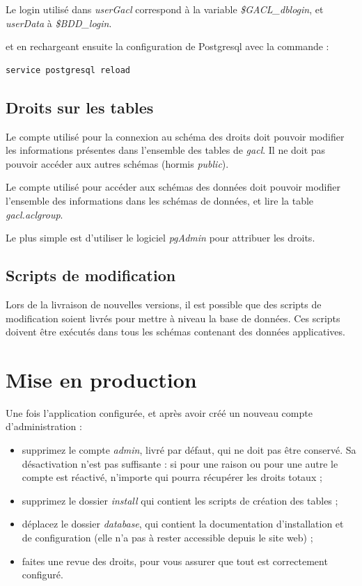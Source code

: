 Le login utilisé dans \textit{userGacl} correspond à la variable \textit{\$GACL\_dblogin}, et \textit{userData} à \textit{\$BDD\_login}.

et en rechargeant ensuite la configuration de Postgresql avec la commande :
\begin{lstlisting}
service postgresql reload
\end{lstlisting}

\subsection{Droits sur les tables}

Le compte utilisé pour la connexion au schéma des droits doit pouvoir modifier les informations présentes dans l'ensemble des tables de \textit{gacl}. Il ne doit pas pouvoir accéder aux autres schémas (hormis \textit{public}).

Le compte utilisé pour accéder aux schémas des données doit pouvoir modifier l'ensemble des informations dans les schémas de données, et lire la table \textit{gacl.aclgroup}.

Le plus simple est d'utiliser le logiciel \textit{pgAdmin} \cite{pgadmin} pour attribuer les droits.

\subsection{Scripts de modification}

Lors de la livraison de nouvelles versions, il est possible que des scripts de modification soient livrés pour mettre à niveau la base de données. Ces scripts doivent être exécutés dans tous les schémas contenant des données applicatives.

\section{Mise en production}

Une fois l'application configurée, et après avoir créé un nouveau compte d'administration :
\begin{itemize}
\item supprimez le compte \textit{admin}, livré par défaut, qui ne doit pas être conservé. Sa désactivation n'est pas suffisante : si pour une raison ou pour une autre le compte est réactivé, n'importe qui pourra récupérer les droits totaux ;
\item supprimez le dossier \textit{install} qui contient les scripts de création des tables ;
\item déplacez le dossier \textit{database}, qui contient la documentation d'installation et de configuration (elle n'a pas à rester accessible depuis le site web) ;
\item faites une revue des droits, pour vous assurer que tout est correctement configuré.
\end{itemize}

